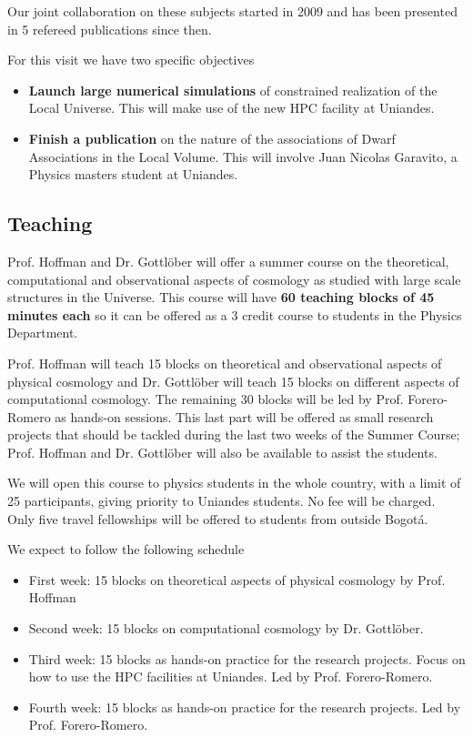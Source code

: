 \documentclass[12pt]{article}
\begin{document}
Our joint collaboration on these subjects started in 2009 and has
been presented in 5 refereed publications since then. 

For this visit we have two specific objectives

\begin{itemize}
\item {\bf Launch large numerical simulations} of constrained realization
of the Local Universe. This will make use of the new HPC facility at Uniandes.
\item {\bf Finish a publication} on the nature of the associations of Dwarf
Associations in the Local Volume. This will involve Juan Nicolas
Garavito, a Physics masters student at Uniandes.
\end{itemize} 

\subsection{Teaching}


Prof. Hoffman and Dr. Gottl\"ober will offer a summer course on
the theoretical, computational and observational aspects of cosmology
as studied with large scale structures in the Universe. This course
will have {\bf 60 teaching blocks of 45 minutes each} so it can be
offered as a 3 credit course to students in the Physics Department. 

Prof. Hoffman will teach 15 blocks on theoretical and observational aspects
of physical cosmology and Dr. Gottl\"ober will teach 15 blocks on
different aspects of computational cosmology. The remaining 30
blocks will be led by Prof. Forero-Romero as hands-on sessions. This
last part will be offered as small research projects that should be
tackled during the last two weeks of the Summer Course; Prof. Hoffman
and Dr. Gottl\"ober will also be available to assist the students. 

We will open this course to physics students in the whole country,
with a limit of 25 participants, giving priority to Uniandes
students. No fee will be charged. Only five travel fellowships will be
offered to students from outside Bogot\'a. 

We expect to follow the following schedule

\begin{itemize}
\item{First week: 15 blocks on theoretical aspects of physical
  cosmology by Prof. Hoffman}
\item{Second week: 15 blocks on computational cosmology by
  Dr. Gottl\"ober.}
\item{Third week: 15 blocks as hands-on practice for the research
  projects. Focus on how to use the HPC facilities at Uniandes. Led by
  Prof. Forero-Romero.} 
\item{Fourth week: 15 blocks as hands-on practice for the research
  projects. Led by Prof. Forero-Romero.}
\end{itemize}
\end{document}
